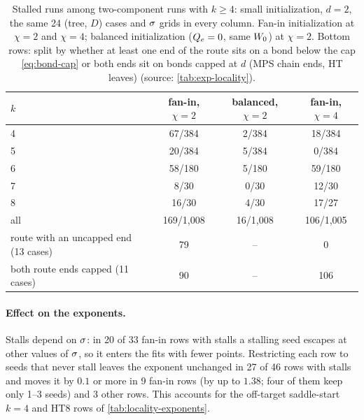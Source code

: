 \begin{table}[tbp]
  \centering
  \caption{Stalled runs among two-component runs with $k\ge4$: small initialization, $d=2$, the same 24 (tree, $D$)
    cases and $\sigma$ grids in every column. Fan-in initialization at $\chi=2$ and $\chi=4$; balanced initialization
    ($Q_{e}=0$, same $W_{0}$) at $\chi=2$. Bottom rows: split by whether at least one end of the route sits on a bond
    below the cap \eqref{eq:bond-cap} or both ends sit on bonds capped at $d$ (MPS chain ends, HT leaves)
    (source: \cref{tab:exp-locality}).}
  \label{tab:locality-stalls}
  \small
  \begin{tabular}{@{}lccc@{}}
    \toprule
    $k$ & fan-in, $\chi=2$ & balanced, $\chi=2$ & fan-in, $\chi=4$ \\
    \midrule
    4 & 67/384 & 2/384 & 18/384 \\
    5 & 20/384 & 5/384 & 0/384 \\
    6 & 58/180 & 5/180 & 59/180 \\
    7 & 8/30 & 0/30 & 12/30 \\
    8 & 16/30 & 4/30 & 17/27 \\
    \midrule
    all & 169/1,008 & 16/1,008 & 106/1,005 \\
    \quad route with an uncapped end (13 cases) & 79 & -- & 0 \\
    \quad both route ends capped (11 cases) & 90 & -- & 106 \\
    \bottomrule
  \end{tabular}
\end{table}

\paragraph{Effect on the exponents.}
\empirical{} Stalls depend on $\sigma$: in 20 of 33 fan-in rows with stalls a stalling seed escapes at other values of
$\sigma$, so it enters the fits with fewer points. Restricting each row to seeds that never stall leaves the exponent
unchanged in 27 of 46 rows with stalls and moves it by $0.1$ or more in 9 fan-in rows (by up to $1.38$; four of them
keep only 1--3 seeds) and 3 other rows. This accounts for the off-target saddle-start $k=4$ and HT8 rows of
\cref{tab:locality-exponents}.

